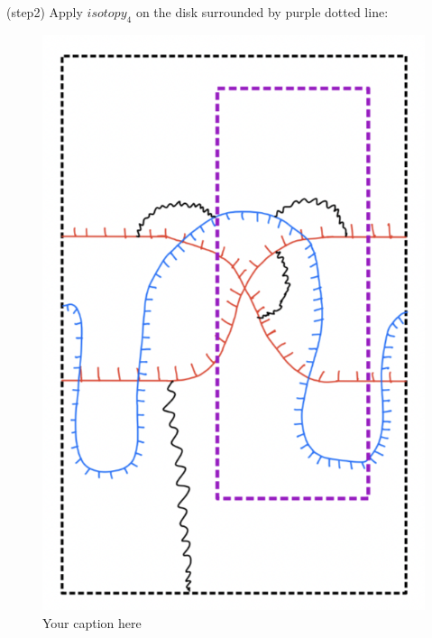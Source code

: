(step2) Apply $isotopy_4$ on the disk surrounded by purple dotted line:
\begin{figure}[H] %
    \centering
    \includegraphics[scale=0.95]{diagrams/lemma9/5.png} %
    \caption{Your caption here}
    \label{fig:your-label}
\end{figure}

